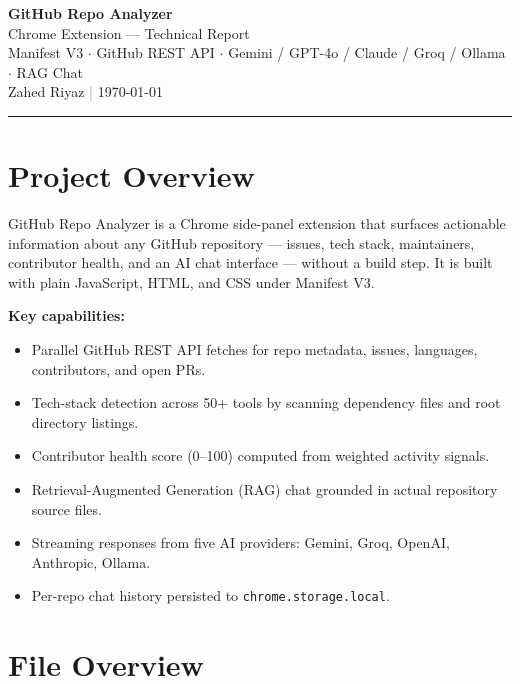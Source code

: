 \documentclass[11pt,a4paper]{article}
\begin{document}
\begin{center}
    {\LARGE\bfseries GitHub Repo Analyzer}\\[4pt]
    {\large Chrome Extension — Technical Report}\\[8pt]
    {\color{grey}\small Manifest V3 $\cdot$ GitHub REST API $\cdot$ Gemini / GPT-4o / Claude / Groq / Ollama $\cdot$ RAG Chat}\\[4pt]
    {\small Zahed Riyaz \quad \textcolor{grey}{|} \quad \today}
\end{center}

\vspace{1em}
\hrule
\vspace{1.5em}

\section{Project Overview}

GitHub Repo Analyzer is a Chrome side-panel extension that surfaces actionable information about any GitHub repository — issues, tech stack, maintainers, contributor health, and an AI chat interface — without a build step. It is built with plain JavaScript, HTML, and CSS under Manifest V3.

\medskip
\textbf{Key capabilities:}
\begin{itemize}[nosep]
    \item Parallel GitHub REST API fetches for repo metadata, issues, languages, contributors, and open PRs.
    \item Tech-stack detection across 50+ tools by scanning dependency files and root directory listings.
    \item Contributor health score (0--100) computed from weighted activity signals.
    \item Retrieval-Augmented Generation (RAG) chat grounded in actual repository source files.
    \item Streaming responses from five AI providers: Gemini, Groq, OpenAI, Anthropic, Ollama.
    \item Per-repo chat history persisted to \texttt{chrome.storage.local}.
\end{itemize}

\section{File Overview}
\end{document}
